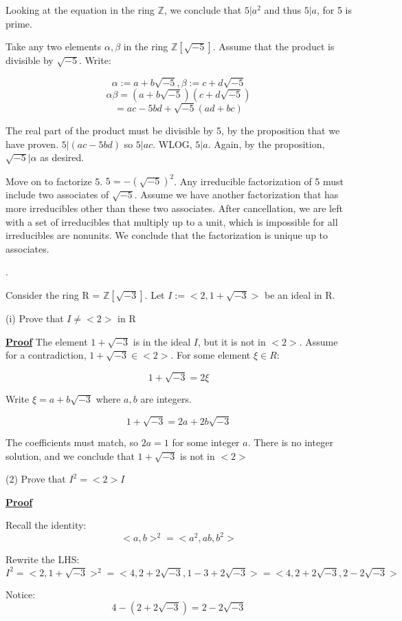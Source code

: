 \documentclass{article}
\newcounter{problemcnt}
\newcommand{\Problem}{{
    \vspace{5mm}
    \stepcounter{problemcnt}
    \noindent
    \arabic{problemcnt}. 
}
}
\newcommand{\Proof}{{
    \vspace{2mm}
    \noindent
    \textbf{
    \underline{Proof}}
}
}
\begin{document}
Looking at the equation in the ring $\mathbb{Z}$,
we conclude that $5|a^2$ and thus $5|a$, for 5 is prime. 

Take any two elements $\alpha, \beta$ in 
the ring $\mathbb{Z}[\sqrt{-5}]$. Assume 
that the product is divisible by 
$\sqrt{-5}$. Write:

\[
    \alpha := a + b\sqrt{-5},
    \beta := c + d\sqrt{-5}
\]
\[
    \alpha\beta = (a + b\sqrt{-5})
    (c + d\sqrt{-5})
\]
\[
    = ac-5bd+\sqrt{-5}(ad+bc)
\]

The real part of the product must be 
divisible by 5, by the proposition that 
we have proven. $5|(ac-5bd)$ so 
$5|ac$. WLOG, $5|a$. Again, by the proposition,
$\sqrt{-5}|\alpha$ as desired. 

Move on to factorize 5. $5 = -(\sqrt{-5})^2$. 
Any irreducible factorization of 5 must 
include two associates of $\sqrt{-5}$. 
Assume we have another factorization that 
has more irreducibles other than these 
two associates. After cancellation, 
we are left with a set of irreducibles 
that multiply up to a unit, which is 
impossible for all irreducibles are nonunits. 
We conclude that the factorization is unique 
up to associates. 




\newpage
\Problem
Consider the ring R = $\mathbb{Z}
[\sqrt{-3}]$. Let 
$I:=<2, 1+\sqrt{-3}>$ be an ideal in R.

\vspace{2mm}
(i) Prove that $I\neq<2>$ in R 

\Proof The element $1 + \sqrt{-3}$ 
is in the ideal $I$, but it is not in 
$<2>$. Assume for a contradiction, 
$1+\sqrt{-3} \in <2>$. For some element 
$\xi \in R$:

\[
    1+\sqrt{-3} = 2\xi
\]

Write $\xi = a+b\sqrt{-3}$ where $a, b$ are 
integers. 

\[
   1+\sqrt{-3} = 2a+2b\sqrt{-3} 
\]

The coefficients must match, so 
$2a = 1$ for some integer $a$. There is 
no integer solution, and we conclude 
that $1+\sqrt{-3}$ is not in $<2>$


(2) Prove that $I^2 = <2>I$

\Proof
Recall the identity:
\[
    <a, b>^2 = <a^2, ab, b^2>
\]

Rewrite the LHS:
\[
    I^2 = <2, 1+\sqrt{-3}>^2
    =<4, 2+2\sqrt{-3}, 1-3+2\sqrt{-3}>
    =<4, 2+2\sqrt{-3}, 2-2\sqrt{-3}>
\]

Notice:
\[
    4-(2+2\sqrt{-3}) = 2-2\sqrt{-3}
\]
\end{document}
